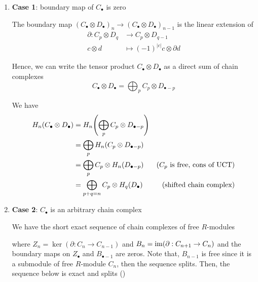 \documentclass{article}
\begin{document}
\begin{longproof}
    \begin{enumerate}
        \item \textbf{Case 1}: boundary map of $C_\bullet$ is zero

        The boundary map $(C_\bullet \otimes D_\bullet)_n \to (C_\bullet \otimes D_\bullet)_{n-1}$ is the linear extension of
        \begin{align*}
        \partial:   C_p \otimes D_q &\to C_p \otimes D_{q-1} \\
                    c \otimes d &\mapsto (-1)^{|c|} c \otimes \partial d
        \end{align*}

        Hence, we can write the tensor product $C_\bullet \otimes D_\bullet$ as a direct sum of chain complexes
        $$
            C_\bullet \otimes D_\bullet = \bigoplus_p C_p \otimes D_{\bullet - p}
        $$

        We have
        \begin{align*}
            H_n(C_\bullet \otimes D_\bullet) 
            &= H_n\tuple*{\bigoplus_p C_p \otimes D_{\bullet-p}} \\
            &= \bigoplus_p H_n(C_p \otimes D_{\bullet-p}) \\
            &= \bigoplus_p C_p \otimes H_n(D_{\bullet - p}) &\text{($C_p$ is free, cons of UCT)}\\
            &= \bigoplus_{p + q = n} C_p \otimes H_q(D_\bullet)&\text{(shifted chain complex)}
        \end{align*}
        
        \item \textbf{Case 2}: $C_\bullet$ is an arbitrary chain complex
        
        We have the short exact sequence of chain complexes of free $R$-modules
        \begin{center}
        \end{center}
    
        where $Z_n = \ker(\partial: C_n \to C_{n-1})$ and $B_n = \operatorname{im} (\partial: C_{n+1} \to C_n)$ and the boundary maps on $Z_\bullet$ and $B_{\bullet-1}$ are zeros. Note that, $B_{n-1}$ is free since it is a submodule of free $R$-module $C_n$, then the sequence splits. Then, the sequence below is exact and splits ()
    

\end{enumerate}
\end{longproof}
\end{document}
